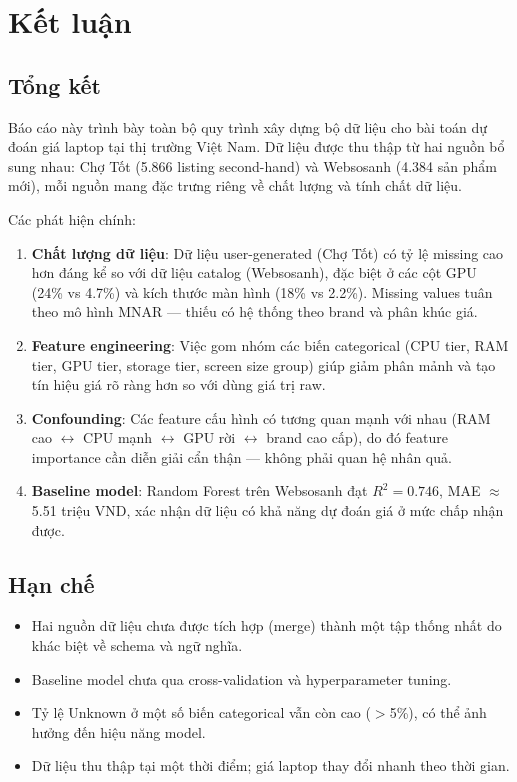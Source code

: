 \section{Kết luận}
\label{sec:conclusion}

\subsection{Tổng kết}

Báo cáo này trình bày toàn bộ quy trình xây dựng bộ dữ liệu cho bài toán dự đoán giá laptop tại thị trường Việt Nam. Dữ liệu được thu thập từ hai nguồn bổ sung nhau: Chợ Tốt (5.866 listing second-hand) và Websosanh (4.384 sản phẩm mới), mỗi nguồn mang đặc trưng riêng về chất lượng và tính chất dữ liệu.

Các phát hiện chính:

\begin{enumerate}[noitemsep]
    \item \textbf{Chất lượng dữ liệu}: Dữ liệu user-generated (Chợ Tốt) có tỷ lệ missing cao hơn đáng kể so với dữ liệu catalog (Websosanh), đặc biệt ở các cột GPU (24\% vs 4.7\%) và kích thước màn hình (18\% vs 2.2\%). Missing values tuân theo mô hình MNAR --- thiếu có hệ thống theo brand và phân khúc giá.
    \item \textbf{Feature engineering}: Việc gom nhóm các biến categorical (CPU tier, RAM tier, GPU tier, storage tier, screen size group) giúp giảm phân mảnh và tạo tín hiệu giá rõ ràng hơn so với dùng giá trị raw.
    \item \textbf{Confounding}: Các feature cấu hình có tương quan mạnh với nhau (RAM cao $\leftrightarrow$ CPU mạnh $\leftrightarrow$ GPU rời $\leftrightarrow$ brand cao cấp), do đó feature importance cần diễn giải cẩn thận --- không phải quan hệ nhân quả.
    \item \textbf{Baseline model}: Random Forest trên Websosanh đạt $R^2 = 0.746$, MAE $\approx$ 5.51 triệu VND, xác nhận dữ liệu có khả năng dự đoán giá ở mức chấp nhận được.
\end{enumerate}

\subsection{Hạn chế}

\begin{itemize}[noitemsep]
    \item Hai nguồn dữ liệu chưa được tích hợp (merge) thành một tập thống nhất do khác biệt về schema và ngữ nghĩa.
    \item Baseline model chưa qua cross-validation và hyperparameter tuning.
    \item Tỷ lệ Unknown ở một số biến categorical vẫn còn cao ($>$5\%), có thể ảnh hưởng đến hiệu năng model.
    \item Dữ liệu thu thập tại một thời điểm; giá laptop thay đổi nhanh theo thời gian.
\end{itemize}

